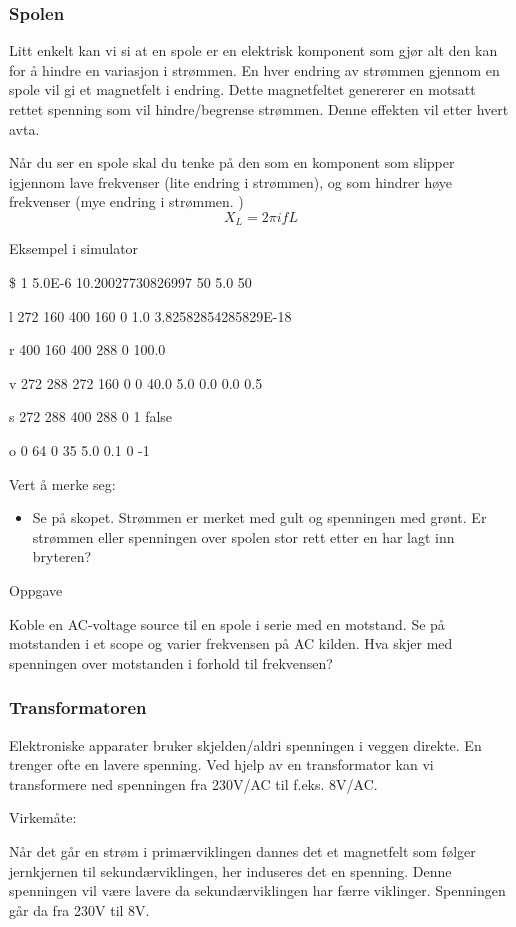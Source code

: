 \documentclass[12pt,a4paper]{article}
\begin{document}
\subsubsection{Spolen}

Litt enkelt kan vi si at en spole er en elektrisk komponent som gjør
alt den kan for å hindre en variasjon i strømmen. En hver endring
av strømmen gjennom en spole vil gi et magnetfelt i endring. Dette
magnetfeltet genererer en motsatt rettet spenning som vil hindre/begrense
strømmen. Denne effekten vil etter hvert avta. 

Når du ser en spole skal du tenke på den som en komponent som slipper
igjennom lave frekvenser (lite endring i strømmen), og som hindrer
høye frekvenser (mye endring i strømmen. )
\[
X_{L}=2\pi ifL
\]

Eksempel i simulator

\$ 1 5.0E-6 10.20027730826997 50 5.0 50

l 272 160 400 160 0 1.0 3.82582854285829E-18

r 400 160 400 288 0 100.0

v 272 288 272 160 0 0 40.0 5.0 0.0 0.0 0.5

s 272 288 400 288 0 1 false

o 0 64 0 35 5.0 0.1 0 -1

Vert å merke seg:
\begin{itemize}
\item Se på skopet. Strømmen er merket med gult og spenningen med grønt.
Er strømmen eller spenningen over spolen stor rett etter en har lagt
inn bryteren?
\end{itemize}
Oppgave

Koble en AC-voltage source til en spole i serie med en motstand. Se
på motstanden i et scope og varier frekvensen på AC kilden. Hva skjer
med spenningen over motstanden i forhold til frekvensen?

\subsubsection{Transformatoren}

Elektroniske apparater bruker skjelden/aldri spenningen i veggen direkte.
En trenger ofte en lavere spenning. Ved hjelp av en transformator
kan vi transformere ned spenningen fra 230V/AC til f.eks. 8V/AC. 

Virkemåte:

Når det går en strøm i primærviklingen dannes det et magnetfelt som
følger jernkjernen til sekundærviklingen, her induseres det en spenning.
Denne spenningen vil være lavere da sekundærviklingen har færre viklinger.
Spenningen går da fra 230V til 8V.
\end{document}
